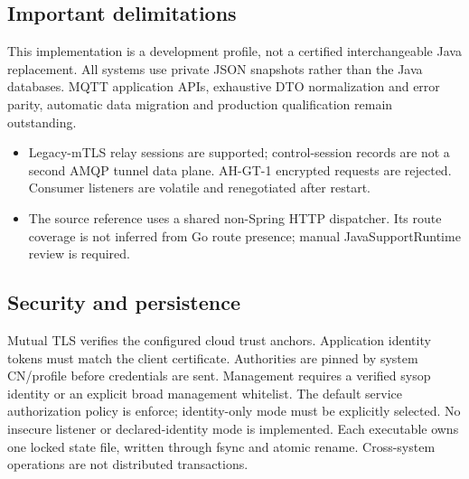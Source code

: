 \documentclass[a4paper]{arrowhead}
\begin{document}
\subsection{Important delimitations}
This implementation is a development profile, not a certified interchangeable Java replacement. All systems use private JSON snapshots rather than the Java databases. MQTT application APIs, exhaustive DTO normalization and error parity, automatic data migration and production qualification remain outstanding.
\begin{itemize}
\item Legacy-mTLS relay sessions are supported; control-session records are not a second AMQP tunnel data plane. AH-GT-1 encrypted requests are rejected. Consumer listeners are volatile and renegotiated after restart.
\item The source reference uses a shared non-Spring HTTP dispatcher. Its route coverage is not inferred from Go route presence; manual JavaSupportRuntime review is required.
\end{itemize}
\subsection{Security and persistence}
Mutual TLS verifies the configured cloud trust anchors. Application identity tokens must match the client certificate. Authorities are pinned by system CN/profile before credentials are sent. Management requires a verified sysop identity or an explicit broad management whitelist. The default service authorization policy is enforce; identity-only mode must be explicitly selected. No insecure listener or declared-identity mode is implemented. Each executable owns one locked state file, written through fsync and atomic rename. Cross-system operations are not distributed transactions.
\clearpage
\end{document}
